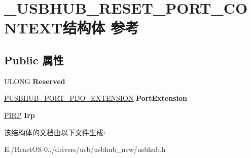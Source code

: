 \hypertarget{struct___u_s_b_h_u_b___r_e_s_e_t___p_o_r_t___c_o_n_t_e_x_t}{}\section{\+\_\+\+U\+S\+B\+H\+U\+B\+\_\+\+R\+E\+S\+E\+T\+\_\+\+P\+O\+R\+T\+\_\+\+C\+O\+N\+T\+E\+X\+T结构体 参考}
\label{struct___u_s_b_h_u_b___r_e_s_e_t___p_o_r_t___c_o_n_t_e_x_t}
\subsection*{Public 属性}
\begin{DoxyCompactItemize}
\item 
\mbox{\label{struct___u_s_b_h_u_b___r_e_s_e_t___p_o_r_t___c_o_n_t_e_x_t_a85c2ebc3a4eda2678346b29da35e3438}} 
U\+L\+O\+NG {\bfseries Reserved}
\item 
\mbox{\label{struct___u_s_b_h_u_b___r_e_s_e_t___p_o_r_t___c_o_n_t_e_x_t_a0e46cf7ade8f26d56c3fdb46f09c1f8b}} 
\hyperlink{struct___u_s_b_h_u_b___p_o_r_t___p_d_o___e_x_t_e_n_s_i_o_n}{P\+U\+S\+B\+H\+U\+B\+\_\+\+P\+O\+R\+T\+\_\+\+P\+D\+O\+\_\+\+E\+X\+T\+E\+N\+S\+I\+ON} {\bfseries Port\+Extension}
\item 
\mbox{\label{struct___u_s_b_h_u_b___r_e_s_e_t___p_o_r_t___c_o_n_t_e_x_t_a8616c7a9bfabe4beb5a7e05bad5ad318}} 
\hyperlink{interfacevoid}{P\+I\+RP} {\bfseries Irp}
\end{DoxyCompactItemize}


该结构体的文档由以下文件生成\+:\begin{DoxyCompactItemize}
\item 
E\+:/\+React\+O\+S-\/0../drivers/usb/usbhub\+\_\+new/usbhub.\+h\end{DoxyCompactItemize}
